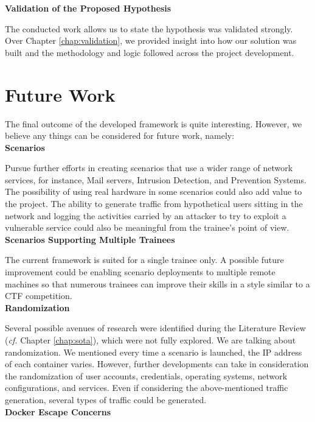 \textbf{Validation of the Proposed Hypothesis}

The conducted work allows us to state the hypothesis was validated strongly. Over Chapter \ref{chap:validation}, we provided insight into how our solution was built and the methodology and logic followed across the project development.

\section{Future Work} \label{sec:future_work}

The final outcome of the developed framework is quite interesting. However, we believe any things can be considered for future work, namely:\\

\textbf{Scenarios}

Pursue further efforts in creating scenarios that use a wider range of network services, for instance, Mail servers, Intrusion Detection, and Prevention Systems. The possibility of using real hardware in some scenarios could also add value to the project. The ability to generate traffic from hypothetical users sitting in the network and logging the activities carried by an attacker to try to exploit a vulnerable service could also be meaningful from the trainee's point of view.\\

\textbf{Scenarios Supporting Multiple Trainees}

The current framework is suited for a single trainee only. A possible future improvement could be enabling scenario deployments to multiple remote machines so that numerous trainees can improve their skills in a style similar to a CTF competition.\\

\textbf{Randomization}

Several possible avenues of research were identified during the Literature Review (\textit{cf.} Chapter \ref{chap:sota}), which were not fully explored. We are talking about randomization. We mentioned every time a scenario is launched, the IP address of each container varies. However, further developments can take in consideration the randomization of user accounts, credentials, operating systems,  network configurations, and services. Even if considering the above-mentioned traffic generation, several types of traffic could be generated.\\

\textbf{Docker Escape Concerns}

